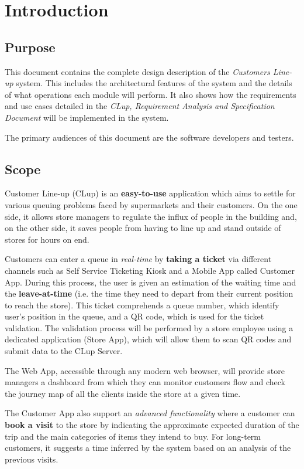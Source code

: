 \chapter{Introduction}

\section{Purpose}
This document contains the complete design description of the \textit{Customers Line-up} system. This includes the architectural features of the system and the details of what operations each module will perform. It also shows how the requirements and use cases detailed in the \textit{CLup, Requirement Analysis and Specification Document} will be implemented in the system.

The primary audiences of this document are the software developers and testers.

\section{Scope}
Customer Line-up (CLup) is an \textbf{easy-to-use} application which aims to settle for various queuing problems faced by supermarkets and their customers.\newline
On the one side, it allows store managers to regulate the influx of people in the building and, on the other side, it saves people from having to line up and stand outside of stores for hours on end.

Customers can enter a queue in \textit{real-time} by \textbf{taking a ticket} via different channels such as Self Service Ticketing Kiosk and a Mobile App called Customer App. During this process, the user is given an estimation of the waiting time and the \textbf{leave-at-time} (i.e. the time they need to depart from their current position to reach the store). This ticket comprehends a queue number, which identify user's position in the queue, and a QR code, which is used for the ticket validation.\newline
The validation process will be performed by a store employee using a dedicated application (Store App), which will allow them to scan QR codes and submit data to the CLup Server.

The Web App, accessible through any modern web browser, will provide store managers a dashboard from which they can monitor customers flow and check the journey map of all the clients inside the store at a given time.

The Customer App also support an \textit{advanced functionality} where a customer can \textbf{book a visit} to the store by indicating the approximate expected duration of the trip and the main categories of items they intend to buy. For long-term customers, it suggests a time inferred by the system based on an analysis of the previous visits.

